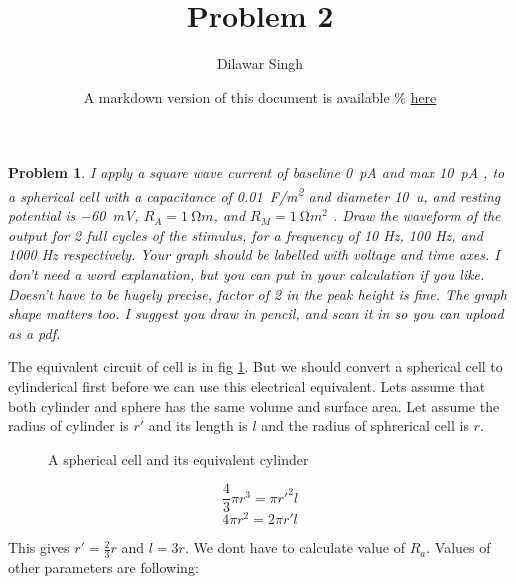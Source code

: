 \documentclass[]{article}
\title{Problem 2}
\author{Dilawar Singh}
\date{A markdown version of this document is available \%
\href{http://github.com/dilawar/courses/raw/master/NeuroCourse/Assignments/Second/Problem02/L2_Q2_DilawarSingh.pandoc}{here}}
\newtheorem{problem}{Problem}
\begin{document}
\maketitle

\begin{problem}

    I apply a square wave current of baseline \SI{0}{pA} and max \SI{10}{pA} ,
    to a spherical cell with a capacitance of \SI{0.01}{F/m^2} and diameter
    \SI{10}{u}, and resting potential is \SI{-60}{mV}, $R_A = \SI{1}{\ohm m}$, and
    $R_M = \SI{1}{\ohm m^2}$ . Draw the waveform of the output for 2 full cycles of
    the stimulus, for a frequency of 10 Hz, 100 Hz, and 1000 Hz respectively.
    Your graph should be labelled with voltage and time axes.  I don’t need a
    word explanation, but you can put in your calculation if you like. Doesn’t
    have to be hugely precise, factor of 2 in the peak height is fine.  The
    graph shape matters too. I suggest you draw in pencil, and scan it in so you
    can upload as a pdf.

\end{problem}

The equivalent circuit of cell is in fig \ref{fig1}. But we should
convert a spherical cell to cylinderical first before we can use this
electrical equivalent. Lets assume that both cylinder and sphere has the
same volume and surface area. Let assume the radius of cylinder is $r'$
and its length is $l$ and the radius of sphrerical cell is $r$.

\begin{figure}[h]
    \centering
    \usetikzlibrary{shapes,shadows}
    \caption{A spherical cell and its equivalent cylinder}
    \label{fig1}
\end{figure}

\[ \frac{4}{3}{\pi r^3} = \pi r'^2 l \] \[ 4 \pi r^2 = 2 \pi r' l \]

This gives $r'=\frac{2}{3}r$ and $l=3r$. We dont have to calculate value
of $R_a$. Values of other parameters are following:
\end{document}
